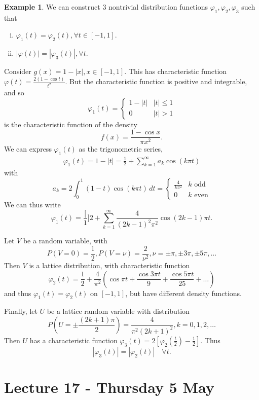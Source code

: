 \documentclass[10pt, oneside, reqno]{amsart}
\theoremstyle{plain}%
\theoremstyle{definition}
\newtheorem{exmp}[thm]{Example}
\theoremstyle{remark}
\renewcommand{\phi}{\varphi}
\begin{document}
\begin{exmp}
	We can construct 3 nontrivial distribution functions $\phi_1, \phi_2, \phi_3$ such that 
\begin{enumerate}[(i)]
	\item $\phi_1(t) = \phi_2(t), \forall t \in [-1,1]$.  
	\item $|\phi(t)| = | \phi_3(t) |, \forall t$.  
\end{enumerate}

Consider $g(x) = 1 - | x |, x \in [ -1, 1]$.  This has characteristic function $\phi(t) = \frac{2(1 - \cos t)}{t^2}$.  But the characteristic function is positive and integrable, and so\[
	\phi_1(t) = \begin{cases}
		1 - |t| & |t| \leq 1 \\
		0		& |t| > 1
	\end{cases}
\] is the characteristic function of the density \[
	f(x) = \frac{1 - \cos x}{\pi x^2}.
\]  We can express $\phi_1(t)$ as the trigonometric series, \begin{align*}
	\phi_1(t) = 1 - |t| = \frac{1}{2} + \sum_{k=1}^\infty a_k \cos( k \pi t) 
\end{align*} with \[
	a_k = 2 \int_0^1 ( 1 - t) \cos(k \pi t) \, dt = \begin{cases} 
		\frac{4}{k \pi^2} 	&\text{$k$ odd} \\
		0					&\text{$k$ even}
	\end{cases}
\]
We can thus write \[
	\phi_1(t) = \frac[1]{2} + \sum_{k=1}^\infty \frac{4}{(2k-1)^2 \pi^2} \cos(2k-1) \pi t.
\]

Let $V$ be a random variable, with \[
	P(V = 0) = \frac{1}{2}, P(V = \nu) = \frac{2}{\nu^2}, \nu = \pm \pi, \pm 3 \pi, \pm 5 \pi, \dots
\]    Then $V$ is a lattice distribution, with characteristic function \[
	\phi_2(t) = \frac{1}{2} + \frac{4}{\pi^2} \left( \cos \pi t + \frac{ \cos 3 \pi t}{9} + \frac{\cos 5 \pi t}{25} + \dots \right) 
\] and thus $\phi_1(t) = \phi_2(t)$ on $[-1,1]$, but have different density functions.

Finally, let $U$ be a lattice random variable with distribution \[
	P(U = \pm \frac{(2k+1) \pi}{2}) = \frac{4}{\pi^2(2k+1)^2}, k = 0,1, 2, \dots
\]  Then $U$ has a characteristic function $\phi_3(t) = 2 \left[ \phi_2(\frac{t}{2}) - \frac{1}{2} \right]$.  Thus \[
	| \phi_3(t) | = | \phi_2(t) | \quad \forall t.
	\]
\end{exmp}

\section{Lecture 17 - Thursday 5 May} %
\label{sec:lecture_17_thursday_5_may}
\end{document}

